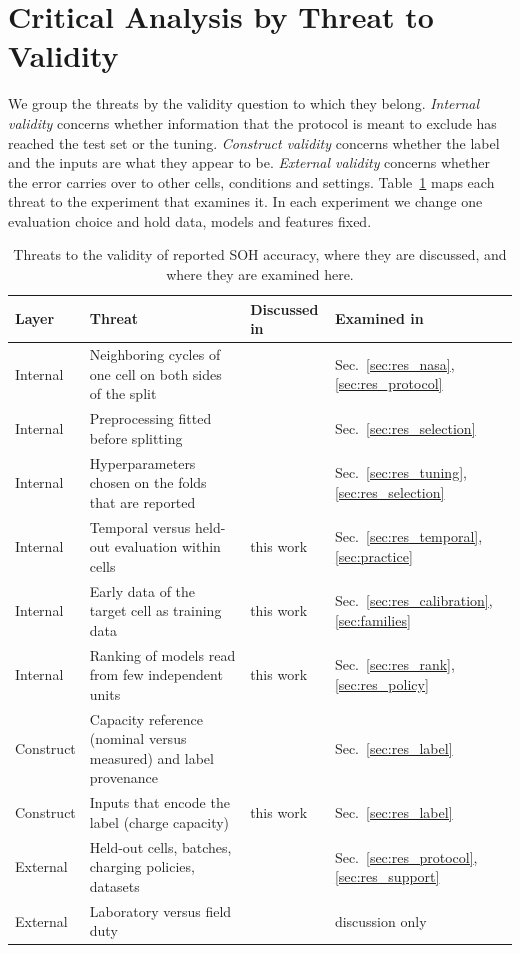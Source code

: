 \documentclass{ieeeaccess}
\begin{document}
\section{Critical Analysis by Threat to Validity}
\label{sec:analysis}
We group the threats by the validity question to which they belong. \emph{Internal validity} concerns whether information that the protocol is meant to exclude has reached the test set or the tuning. \emph{Construct validity} concerns whether the label and the inputs are what they appear to be. \emph{External validity} concerns whether the error carries over to other cells, conditions and settings. Table~\ref{tab:framework} maps each threat to the experiment that examines it. In each experiment we change one evaluation choice and hold data, models and features fixed.

\begin{table}[!t]
\centering
\caption{Threats to the validity of reported SOH accuracy, where they are discussed, and where they are examined here.}
\label{tab:framework}
\footnotesize
\begin{tabular}{p{}p{}p{}p{}}
\toprule
Layer & Threat & Discussed in & Examined in \\
\midrule
Internal & Neighboring cycles of one cell on both sides of the split & \cite{rizanov2026,sohail2026} & Sec.~\ref{sec:res_nasa}, \ref{sec:res_protocol} \\
Internal & Preprocessing fitted before splitting & \cite{sohail2026} & Sec.~\ref{sec:res_selection} \\
Internal & Hyperparameters chosen on the folds that are reported & \cite{varma2006} & Sec.~\ref{sec:res_tuning}, \ref{sec:res_selection} \\
Internal & Temporal versus held-out evaluation within cells & this work & Sec.~\ref{sec:res_temporal}, \ref{sec:practice} \\
Internal & Early data of the target cell as training data & this work & Sec.~\ref{sec:res_calibration}, \ref{sec:families} \\
Internal & Ranking of models read from few independent units & this work & Sec.~\ref{sec:res_rank}, \ref{sec:res_policy} \\
Construct & Capacity reference (nominal versus measured) and label provenance & \cite{zhang2024} & Sec.~\ref{sec:res_label} \\
Construct & Inputs that encode the label (charge capacity) & this work & Sec.~\ref{sec:res_label} \\
External & Held-out cells, batches, charging policies, datasets & \cite{rizanov2026,sohail2026} & Sec.~\ref{sec:res_protocol}, \ref{sec:res_support} \\
External & Laboratory versus field duty & \cite{pozzato2023,zhao2026,ma2026} & discussion only \\
\bottomrule
\end{tabular}
\end{table}
\end{document}
